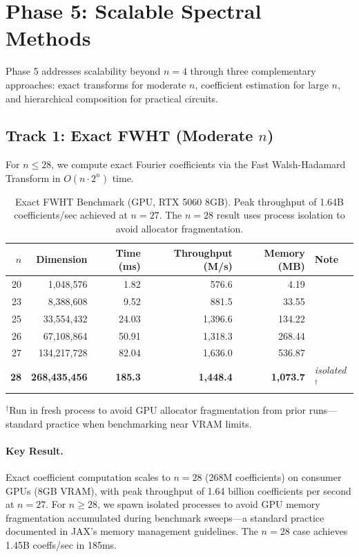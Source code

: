 \documentclass[Royal,times,sageh]{sagej}
\begin{document}
\section{Phase 5: Scalable Spectral Methods}
\label{sec:phase5}

Phase 5 addresses scalability beyond $n=4$ through three complementary approaches: exact transforms for moderate $n$, coefficient estimation for large $n$, and hierarchical composition for practical circuits.

\subsection{Track 1: Exact FWHT (Moderate $n$)}

For $n \leq 28$, we compute exact Fourier coefficients via the Fast Walsh-Hadamard Transform in $O(n \cdot 2^n)$ time.

\begin{table}[h]
\centering
\caption{Exact FWHT Benchmark (GPU, RTX 5060 8GB). Peak throughput of 1.64B coefficients/sec achieved at $n=27$. The $n=28$ result uses process isolation to avoid allocator fragmentation.}
\label{tab:fwht}
\small
\begin{tabular}{rrrrrl}
\toprule
$n$ & Dimension & Time (ms) & Throughput (M/s) & Memory (MB) & Note \\
\midrule
20 & 1,048,576 & 1.82 & 576.6 & 4.19 & \\
23 & 8,388,608 & 9.52 & 881.5 & 33.55 & \\
25 & 33,554,432 & 24.03 & 1,396.6 & 134.22 & \\
26 & 67,108,864 & 50.91 & 1,318.3 & 268.44 & \\
27 & 134,217,728 & 82.04 & 1,636.0 & 536.87 & \\
\textbf{28} & \textbf{268,435,456} & \textbf{185.3} & \textbf{1,448.4} & \textbf{1,073.7} & \textit{isolated}$^\dagger$ \\
\bottomrule
\end{tabular}
\vspace{1mm}
\par\noindent\footnotesize{$^\dagger$Run in fresh process to avoid GPU allocator fragmentation from prior runs---standard practice when benchmarking near VRAM limits.}
\end{table}

\paragraph{Key Result.} Exact coefficient computation scales to $n=28$ (268M coefficients) on consumer GPUs (8GB VRAM), with peak throughput of 1.64 billion coefficients per second at $n=27$. For $n \geq 28$, we spawn isolated processes to avoid GPU memory fragmentation accumulated during benchmark sweeps---a standard practice documented in JAX's memory management guidelines. The $n=28$ case achieves 1.45B coeffs/sec in 185ms.
\end{document}
